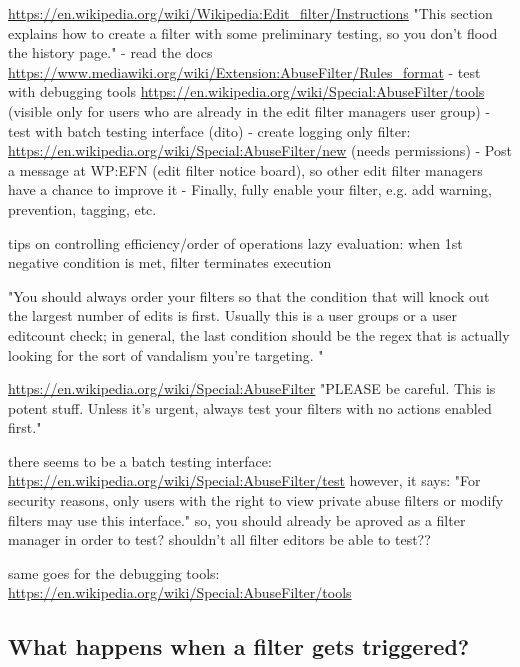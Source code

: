 \documentclass{sigchi}
\begin{document}
\url{https://en.wikipedia.org/wiki/Wikipedia:Edit_filter/Instructions}
"This section explains how to create a filter with some preliminary testing, so you don't flood the history page."
- read the docs \url{https://www.mediawiki.org/wiki/Extension:AbuseFilter/Rules_format}
- test with debugging tools  \url{https://en.wikipedia.org/wiki/Special:AbuseFilter/tools} (visible only for users who are already in the edit filter managers user group)
- test with batch testing interface (dito)
- create logging only filter: \url{https://en.wikipedia.org/wiki/Special:AbuseFilter/new} (needs permissions)
- Post a message at WP:EFN (edit filter notice board), so other edit filter managers have a chance to improve it
- Finally, fully enable your filter, e.g. add warning, prevention, tagging, etc.

tips on controlling efficiency/order of operations
lazy evaluation: when 1st negative condition is met, filter terminates execution

"You should always order your filters so that the condition that will knock out the largest number of edits is first. Usually this is a user groups or a user editcount check; in general, the last condition should be the regex that is actually looking for the sort of vandalism you're targeting. "

\url{https://en.wikipedia.org/wiki/Special:AbuseFilter}
"PLEASE be careful. This is potent stuff. Unless it's urgent, always test your filters with no actions enabled first."

there seems to be a batch testing interface: \url{https://en.wikipedia.org/wiki/Special:AbuseFilter/test}
however, it says: "For security reasons, only users with the right to view private abuse filters or modify filters may use this interface."
so, you should already be aproved as a filter manager in order to test?
shouldn't all filter editors be able to test??

same goes for the debugging tools: \url{https://en.wikipedia.org/wiki/Special:AbuseFilter/tools}

\subsection{What happens when a filter gets triggered?}
\end{document}
